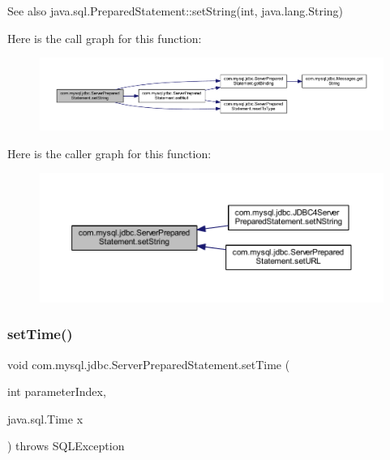 \begin{DoxySeeAlso}{See also}
java.\+sql.\+Prepared\+Statement\+::set\+String(int, java.\+lang.\+String) 
\end{DoxySeeAlso}
Here is the call graph for this function\+:
\nopagebreak
\begin{figure}[H]
\begin{center}
\leavevmode
\includegraphics[width=350pt]{classcom_1_1mysql_1_1jdbc_1_1_server_prepared_statement_ab4b57b9dce4d775c23a01c462bc86b18_cgraph}
\end{center}
\end{figure}
Here is the caller graph for this function\+:
\nopagebreak
\begin{figure}[H]
\begin{center}
\leavevmode
\includegraphics[width=350pt]{classcom_1_1mysql_1_1jdbc_1_1_server_prepared_statement_ab4b57b9dce4d775c23a01c462bc86b18_icgraph}
\end{center}
\end{figure}
\mbox{\label{classcom_1_1mysql_1_1jdbc_1_1_server_prepared_statement_ad97cc0f62d7be5fcb82e97a00a216b24}} 
\subsubsection{\texorpdfstring{set\+Time()}{setTime()}\hspace{0.1cm}{\footnotesize\ttfamily [1/2]}}
{\footnotesize\ttfamily void com.\+mysql.\+jdbc.\+Server\+Prepared\+Statement.\+set\+Time (\begin{DoxyParamCaption}\item[{int}]{parameter\+Index,  }\item[{java.\+sql.\+Time}]{x }\end{DoxyParamCaption}) throws S\+Q\+L\+Exception}

